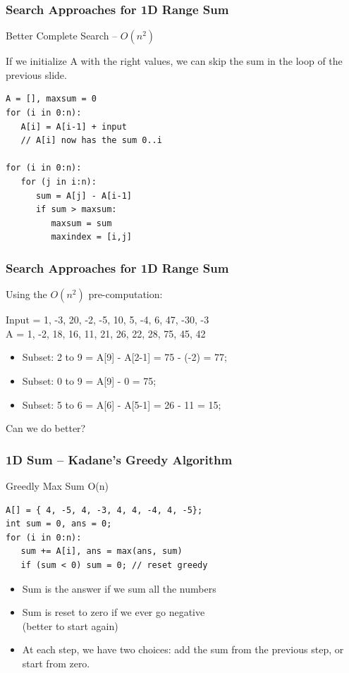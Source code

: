 \documentclass{beamer}
\begin{document}
\begin{frame}[fragile]
  \frametitle{Search Approaches for 1D Range Sum}
  \begin{block}{Better Complete Search -- $O(n^2)$}

    If we initialize A with the right values, we can skip the sum in
    the loop of the previous slide.

{\smaller
\begin{verbatim}
A = [], maxsum = 0
for (i in 0:n):
   A[i] = A[i-1] + input
   // A[i] now has the sum 0..i

for (i in 0:n):
   for (j in i:n):
      sum = A[j] - A[i-1]
      if sum > maxsum:
         maxsum = sum
         maxindex = [i,j]
\end{verbatim}
}
  \end{block}
\end{frame}

\begin{frame}
  \frametitle{Search Approaches for 1D Range Sum}
  Using the $O(n^2)$ pre-computation:

  \bigskip
  
  \begin{center}
    Input = 1, -3, 20, -2, -5, 10, 5, -4, 6, 47, -30, -3\\
    A = 1, -2, 18, 16, 11, 21, 26, 22, 28, 75, 45, 42\\
  \end{center}

  \bigskip
  
  \begin{itemize}
  \item Subset: 2 to 9 = A[9] - A[2-1] = 75 - (-2) = 77;
  \item Subset: 0 to 9 = A[9] - 0 = 75;
  \item Subset: 5 to 6 = A[6] - A[5-1] = 26 - 11 = 15;
  \end{itemize}

  \bigskip

  Can we do better?
  
\end{frame}

\begin{frame}[fragile]
  \frametitle{1D Sum -- Kadane's Greedy Algorithm}
  \begin{block}{Greedly Max Sum O(n)}
      {\smaller
\begin{verbatim}
A[] = { 4, -5, 4, -3, 4, 4, -4, 4, -5};
int sum = 0, ans = 0;
for (i in 0:n):
   sum += A[i], ans = max(ans, sum)
   if (sum < 0) sum = 0; // reset greedy
\end{verbatim}
      }
  \end{block}

\begin{itemize}
\item Sum is the answer if we sum all the numbers
\item Sum is reset to zero if we ever go negative\\
  (better to start again)
\item At each step, we have two choices: add the sum from the previous
  step, or start from zero.
\end{itemize}
\end{frame}
\end{document}
